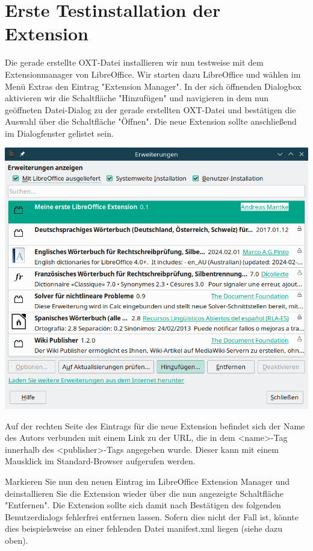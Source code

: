 \documentclass[12pt,a4paper,titlepage]{book}
\begin{document}
\section{Erste Testinstallation der Extension}

Die gerade erstellte OXT-Datei installieren wir nun testweise mit dem Extensionmanager von LibreOffice. Wir starten dazu LibreOffice und wählen im Menü Extras den Eintrag "Extension Manager". In der sich öffnenden Dialogbox aktivieren wir die Schaltfläche "Hinzufügen" und navigieren in dem nun geöffneten Datei-Dialog zu der gerade erstellten OXT-Datei und bestätigen die Auswahl über die Schaltfläche "Öffnen". Die neue Extension sollte anschließend im Dialogfenster gelistet sein.
\begin{center}
	\captionsetup{type=figure}
	\includegraphics[width=0.7\linewidth]{pics/libo24_2_extensionmanager_extension_load01}
	\label{fig:extensionmanager_extension_load01}
\end{center}



Auf der rechten Seite des Eintrags für die neue Extension befindet sich der Name des Autors verbunden mit einem Link zu der URL, die in dem <name>-Tag innerhalb des <publisher>-Tags angegeben wurde. Dieser kann mit einem Mausklick im Standard-Browser aufgerufen werden.

Markieren Sie nun den neuen Eintrag im LibreOffice Extension Manager und deinstallieren Sie die Extension wieder über die nun angezeigte Schaltfläche "Entfernen". Die Extension sollte sich damit nach Bestätigen des folgenden Benutzerdialogs fehlerfrei entfernen lassen. Sofern dies nicht der Fall ist, könnte dies beispielsweise an einer fehlenden Datei manifest.xml liegen (siehe dazu oben).
\end{document}
